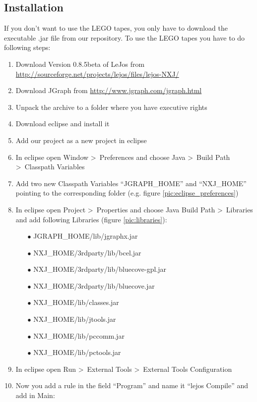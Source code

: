 \documentclass[%
  a4paper,%
  11pt,%
  blue,%
  hyperref	%
  ]{tubsartcl}
\begin{document}
\subsection{Installation}
\label{sec:installation}
If you don't want to use the LEGO tapes, you only have to download the executable .jar file from our repository.
To use the LEGO tapes you have to do following steps:
\begin{enumerate}
	\item Download Version 0.8.5beta of LeJos from \href{http://sourceforge.net/projects/lejos/files/lejos-NXJ/}{http://sourceforge.net/projects/lejos/files/lejos-NXJ/}
	\item Download JGraph from \href{http://www.jgraph.com/jgraph.html}{http://www.jgraph.com/jgraph.html}
	\item Unpack the archive to a folder where you have executive rights
	\item Download eclipse and install it
	\item Add our project as a new project in eclipse
	\item In eclipse open Window \textgreater\ Preferences and choose Java \textgreater\ Build Path \textgreater\ Classpath Variables
	\item Add two new Classpath Variables ``JGRAPH\_HOME'' and ``NXJ\_HOME'' pointing to the corresponding folder (e.g. figure \ref{pic:eclipse_preferences})
	\item In eclipse open Project \textgreater\ Properties and choose Java Build Path \textgreater\ Libraries and add following Libraries (figure \ref{pic:libraries}):
	\begin{enumerate}
	\item[$\bullet$] JGRAPH\_HOME/lib/jgraphx.jar
	\item[$\bullet$] NXJ\_HOME/3rdparty/lib/bcel.jar
	\item[$\bullet$] NXJ\_HOME/3rdparty/lib/bluecove-gpl.jar
	\item[$\bullet$] NXJ\_HOME/3rdparty/lib/bluecove.jar
	\item[$\bullet$] NXJ\_HOME/lib/classes.jar
	\item[$\bullet$] NXJ\_HOME/lib/jtools.jar
	\item[$\bullet$] NXJ\_HOME/lib/pccomm.jar
	\item[$\bullet$] NXJ\_HOME/lib/pctools.jar
	\end{enumerate}
	\item In eclipse open Run \textgreater\ External Tools \textgreater\ External Tools Configuration
	\item Now you add a rule in the field ``Program'' and name it ``lejos Compile'' and add in Main:

\end{enumerate}
\end{document}
